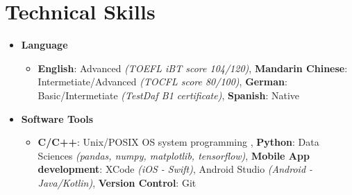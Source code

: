 \section{\sectionheading Technical Skills}

\begin{itemize}[leftmargin=0pt, label={}]%

\item{
{\sectionheading\large{\textbf{Language}}}

    \vspace{-6pt}
    \begin{itemize}[label=\textbullet, leftmargin=*, noitemsep]
        \item{\textbf{English}: Advanced \textit{(TOEFL iBT score 104/120)}, \textbf{Mandarin Chinese}: Intermetiate/Advanced \textit{(TOCFL score 80/100)}, \textbf{German}: Basic/Intermetiate \textit{(TestDaf B1 certificate)}, \textbf{Spanish}: Native}
    \end{itemize}
}

\item{
{\sectionheading\large{\textbf{Software Tools}}}

    \vspace{-6pt}
    \begin{itemize}[label=\textbullet, leftmargin=*, noitemsep]
        \item{\textbf{C/C++}: Unix/POSIX OS system programming \textit{}, \textbf{Python}: Data Sciences \textit{(pandas, numpy, matplotlib, tensorflow)}, \textbf{Mobile App development}: XCode \textit{(iOS - Swift)}, Android Studio \textit{(Android - Java/Kotlin)}, \textbf{Version Control}: Git}
    \end{itemize}
}
\end{itemize}
